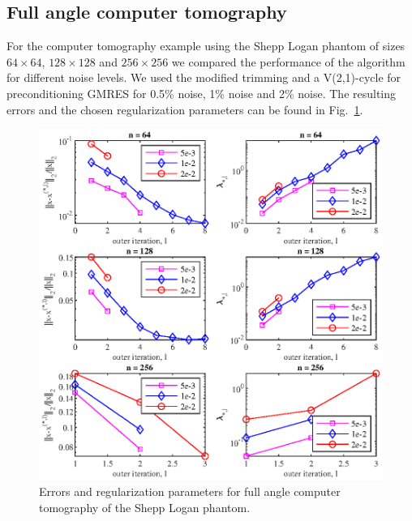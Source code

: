 \subsection{Full angle computer tomography}
For the computer tomography example using the Shepp Logan phantom of sizes $64 \times 64$, $128 \times 128$ and $256 \times 256$ we compared the performance of the algorithm for different noise levels. We used the modified trimming and a V(2,1)-cycle for preconditioning GMRES for 0.5\% noise, 1\% noise and 2\% noise. The resulting errors and the chosen regularization parameters can be found in Fig.~\ref{fig:shepp_logan_errs_and_reg_params}.
\begin{figure}[htbp]
\begin{center}
\includegraphics{figures/shepp_logan_errs_and_reg_params}
\caption{Errors and regularization parameters for full angle computer tomography of the Shepp Logan phantom.}
\label{fig:shepp_logan_errs_and_reg_params}
\end{center}
\end{figure}
